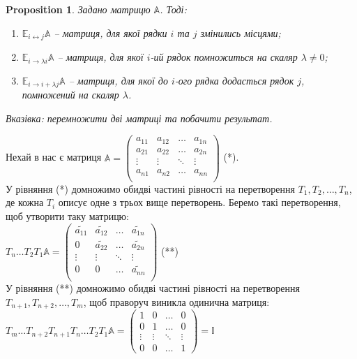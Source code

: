 \documentclass[a4paper, 10pt]{article}
\theoremstyle{theoremdd}
\newtheorem{proposition}[theorem]{Proposition}
\begin{document}
\begin{proposition}
Задано матрицю $\mathbb{A}$. Тоді:
\begin{enumerate}[nosep, label={\arabic*)}, wide=0pt]
	\item $\mathbb{E}_{i \leftrightarrow j}\mathbb{A}$ -- матриця, для якої рядки $i$ та $j$ змінились місцями;
	\item $\mathbb{E}_{i \rightarrow \lambda i}\mathbb{A}$ -- матриця, для якої $i$-ий рядок помножиться на скаляр $\lambda \neq 0$;
	\item $\mathbb{E}_{i \rightarrow i + \lambda j}\mathbb{A}$ -- матриця, для якої до $i$-ого рядка додасться рядок $j$, помножений на скаляр $\lambda$.
\end{enumerate}
	\textit{Вказівка: перемножити дві матриці та побачити результат.}
\end{proposition}
\noindent
Нехай в нас є матриця $\mathbb{A} = \begin{pmatrix}
a_{11} & a_{12} & \dots & a_{1n} \\
a_{21} & a_{22} & \dots & a_{2n} \\
\vdots & \vdots & \ddots & \vdots \\
a_{n1} & a_{n2} & \dots & a_{nn} \\
\end{pmatrix}$ (*). \\
У рівняння (*) домножимо обидві частині рівності на перетворення $T_1,T_2, \dots, T_n$, де кожна $T_i$ описує одне з трьох вище перетворень. Беремо такі перетворення, щоб утворити таку матрицю:\\
$T_n \dots T_2 T_1 \mathbb{A} = \begin{pmatrix}
\widetilde{a_{11}} & \widetilde{a_{12}} & \dots & \widetilde{a_{1n}} \\
0 & \widetilde{a_{22}} & \dots & \widetilde{a_{2n}} \\
\vdots & \vdots & \ddots & \vdots \\
0 & 0 & \dots & \widetilde{a_{nn}} \\
\end{pmatrix}$ (**) \\
У рівняння (**) домножимо обидві частині рівності на перетворення $T_{n+1}, T_{n+2},\dots, T_m$, щоб праворуч виникла одинична матриця:\\
$T_m \dots T_{n+2} T_{n+1} T_n \dots T_2 T_1 \mathbb{A} = \begin{pmatrix}
1 & 0 & \dots & 0 \\
0 & 1 & \dots & 0 \\
\vdots & \vdots & \ddots & \vdots \\
0 & 0 & \dots & 1
\end{pmatrix} = \mathbb{I}$\\
\end{document}
